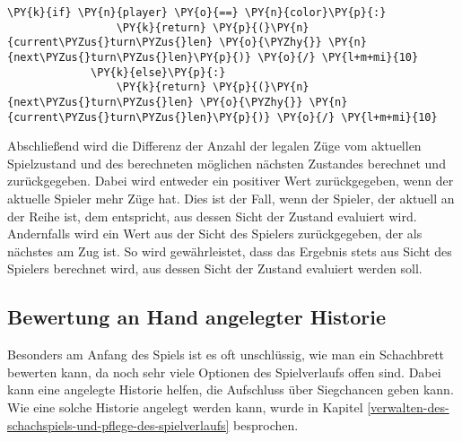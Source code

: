 \begin{Verbatim}[commandchars=\\\{\}]
             \PY{k}{if} \PY{n}{player} \PY{o}{==} \PY{n}{color}\PY{p}{:}
                 \PY{k}{return} \PY{p}{(}\PY{n}{current\PYZus{}turn\PYZus{}len} \PY{o}{\PYZhy{}} \PY{n}{next\PYZus{}turn\PYZus{}len}\PY{p}{)} \PY{o}{/} \PY{l+m+mi}{10}
             \PY{k}{else}\PY{p}{:}
                 \PY{k}{return} \PY{p}{(}\PY{n}{next\PYZus{}turn\PYZus{}len} \PY{o}{\PYZhy{}} \PY{n}{current\PYZus{}turn\PYZus{}len}\PY{p}{)} \PY{o}{/} \PY{l+m+mi}{10}
\end{Verbatim}

    Abschließend wird die Differenz der Anzahl der legalen Züge vom
aktuellen Spielzustand und des berechneten möglichen nächsten Zustandes
berechnet und zurückgegeben. Dabei wird entweder ein positiver Wert
zurückgegeben, wenn der aktuelle Spieler mehr Züge hat. Dies ist der
Fall, wenn der Spieler, der aktuell an der Reihe ist, dem entspricht,
aus dessen Sicht der Zustand evaluiert wird. Andernfalls wird ein Wert
aus der Sicht des Spielers zurückgegeben, der als nächstes am Zug ist.
So wird gewährleistet, dass das Ergebnis stets aus Sicht des Spielers
berechnet wird, aus dessen Sicht der Zustand evaluiert werden soll.

    \subsection{Bewertung an Hand angelegter
Historie}\label{bewertung-an-hand-angelegter-historie}

Besonders am Anfang des Spiels ist es oft unschlüssig, wie man ein
Schachbrett bewerten kann, da noch sehr viele Optionen des Spielverlaufs
offen sind. Dabei kann eine angelegte Historie helfen, die Aufschluss
über Siegchancen geben kann. Wie eine solche Historie angelegt werden
kann, wurde in Kapitel \ref{verwalten-des-schachspiels-und-pflege-des-spielverlaufs} besprochen.

